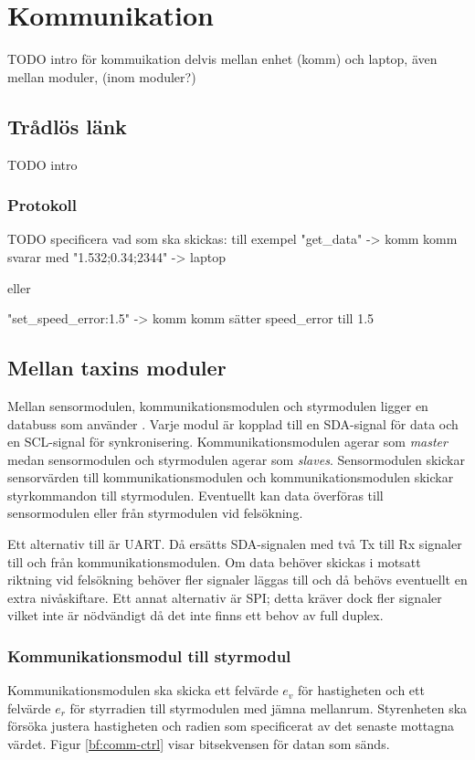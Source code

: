 \documentclass[designspec/spec.tex]{subfiles}
\begin{document}
\section{Kommunikation}
TODO intro för kommuikation 
delvis mellan enhet (komm) och laptop, även mellan moduler, (inom moduler?)

\subsection{Trådlös länk}
TODO intro

\subsubsection{Protokoll}
TODO specificera vad som ska skickas: till exempel
    "get\_data" -> komm
        komm svarar med "1.532;0.34;2344" -> laptop

    eller

    "set\_speed\_error:1.5" -> komm
        komm sätter speed\_error till 1.5

\subsection{Mellan taxins moduler}
Mellan sensormodulen, kommunikationsmodulen och styrmodulen ligger en databuss
som använder {\iic}. Varje modul är kopplad till en SDA-signal för data och en
SCL-signal för synkronisering. Kommunikationsmodulen agerar som \emph{master}
medan sensormodulen och styrmodulen agerar som \emph{slaves}. Sensormodulen
skickar sensorvärden till kommunikationsmodulen och kommunikationsmodulen
skickar styrkommandon till styrmodulen. Eventuellt kan data överföras till
sensormodulen eller från styrmodulen vid felsökning.

Ett alternativ till {\iic} är UART. Då ersätts SDA-signalen med två Tx till Rx
signaler till och från kommunikationsmodulen. Om data behöver skickas i motsatt
riktning vid felsökning behöver fler signaler läggas till och då behövs
eventuellt en extra nivåskiftare. Ett annat alternativ är SPI; detta kräver
dock fler signaler vilket inte är nödvändigt då det inte finns ett behov av
full duplex.

\subsubsection{Kommunikationsmodul till styrmodul}
Kommunikationsmodulen ska skicka ett felvärde $e_v$ för hastigheten och ett
felvärde $e_r$ för styrradien till styrmodulen med jämna mellanrum. Styrenheten
ska försöka justera hastigheten och radien som specificerat av det senaste
mottagna värdet. Figur \ref{bf:comm-ctrl} visar bitsekvensen för datan som
sänds.
\end{document}
